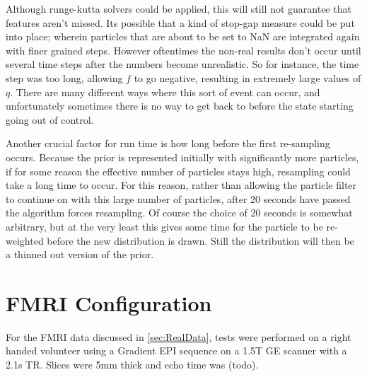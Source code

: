 Although runge-kutta solvers could be applied, this will still not
guarantee that features aren't missed. Its possible that a
kind of stop-gap measure could be put into place; wherein particles that are
about to be set to NaN are integrated again with finer grained steps. However
oftentimes the non-real results don't occur until several time steps after the 
numbers become unrealistic. So for instance, the time step was too long, allowing 
$f$ to go negative, resulting in extremely large values of $q$. There are many
different ways where this sort of event can occur, and unfortunately sometimes
there is no way to get back to before the state starting going out of control.

Another crucial factor for run time is how long before the first re-sampling 
occurs. Because the prior is represented initially with significantly more
particles, if for some reason the effective
number of particles stays high, resampling could take a long time to occur.
For this reason, rather than allowing the particle filter to continue on 
with this large number of particles, after 20 seconds have passed the
algorithm forces resampling. Of course the choice of 20 seconds is somewhat
arbitrary, but at the very least this gives some time for the particle to
be re-weighted before the new distribution is drawn. Still the
distribution will then be a thinned out version of the prior. 


\section{FMRI Configuration}
For the FMRI data discussed in \autoref{sec:RealData}, tests were 
performed on a right handed volunteer using a Gradient EPI sequence
on a 1.5T GE scanner with a 2.1s TR. Slices were 5mm thick and echo
time was (todo). 


